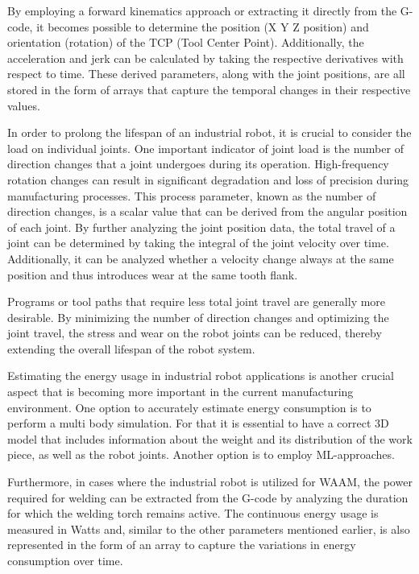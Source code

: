 By employing a forward kinematics approach or extracting it directly from the G-code, it becomes possible to determine the position (X Y Z position) and orientation (rotation) of the TCP (Tool Center Point). Additionally, the acceleration and jerk can be calculated by taking the respective derivatives with respect to time. These derived parameters, along with the joint positions, are all stored in the form of arrays that capture the temporal changes in their respective values.

In order to prolong the lifespan of an industrial robot, it is crucial to consider the load on individual joints. One important indicator of joint load is the number of direction changes that a joint undergoes during its operation. High-frequency rotation changes can result in significant degradation and loss of precision during manufacturing processes.
This process parameter, known as the number of direction changes, is a scalar value that can be derived from the angular position of each joint. By further analyzing the joint position data, the total travel of a joint can be determined by taking the integral of the joint velocity over time.
Additionally, it can be analyzed whether a velocity change always at the same position and thus introduces wear at the same tooth flank.

Programs or tool paths that require less total joint travel are generally more desirable. By minimizing the number of direction changes and optimizing the joint travel, the stress and wear on the robot joints can be reduced, thereby extending the overall lifespan of the robot system.


Estimating the energy usage in industrial robot applications is another crucial aspect that is becoming more important in the current manufacturing environment. One option to accurately estimate energy consumption is to perform a multi body simulation. For that it is essential to have a correct 3D model that includes information about the weight and its distribution of the work piece, as well as the robot joints. Another option is to employ ML-approaches.

Furthermore, in cases where the industrial robot is utilized for WAAM, the power required for welding can be extracted from the G-code by analyzing the duration for which the welding torch remains active. The continuous energy usage is measured in Watts and, similar to the other parameters mentioned earlier, is also represented in the form of an array to capture the variations in energy consumption over time.

